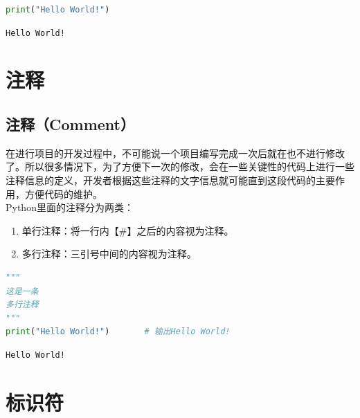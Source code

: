 
\begin{lstlisting}[language=Python]
print("Hello World!")
\end{lstlisting}

\begin{tcolorbox}
	\begin{verbatim}
Hello World!
	\end{verbatim}
\end{tcolorbox}

\newpage

\section{注释}

\subsection{注释（Comment）}

在进行项目的开发过程中，不可能说一个项目编写完成一次后就在也不进行修改了。所以很多情况下，为了方便下一次的修改，会在一些关键性的代码上进行一些注释信息的定义，开发者根据这些注释的文字信息就可能直到这段代码的主要作用，方便代码的维护。 \\

Python里面的注释分为两类：

\begin{enumerate}
	\item 单行注释：将一行内【\#】之后的内容视为注释。
	\item 多行注释：三引号中间的内容视为注释。
\end{enumerate}


\begin{lstlisting}[language=Python]
"""
这是一条
多行注释
"""
print("Hello World!")		# 输出Hello World!
\end{lstlisting}

\begin{tcolorbox}
	\begin{verbatim}
Hello World!
	\end{verbatim}
\end{tcolorbox}

\newpage

\section{标识符}

